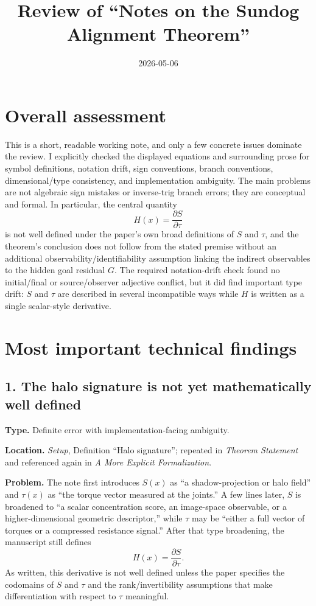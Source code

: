 \documentclass[11pt]{article}
\title{Review of ``Notes on the Sundog Alignment Theorem''}
\author{}
\date{2026-05-06}
\begin{document}
\maketitle

\section*{Overall assessment}

This is a short, readable working note, and only a few concrete issues dominate the review. I explicitly checked the displayed equations and surrounding prose for symbol definitions, notation drift, sign conventions, branch conventions, dimensional/type consistency, and implementation ambiguity. The main problems are not algebraic sign mistakes or inverse-trig branch errors; they are conceptual and formal. In particular, the central quantity
\[
H(x) = \frac{\partial S}{\partial \tau}
\]
is not well defined under the paper's own broad definitions of $S$ and $\tau$, and the theorem's conclusion does not follow from the stated premise without an additional observability/identifiability assumption linking the indirect observables to the hidden goal residual $G$. The required notation-drift check found no initial/final or source/observer adjective conflict, but it did find important type drift: $S$ and $\tau$ are described in several incompatible ways while $H$ is written as a single scalar-style derivative.

\section*{Most important technical findings}

\subsection*{1. The halo signature is not yet mathematically well defined}

\textbf{Type.} Definite error with implementation-facing ambiguity.

\textbf{Location.} \emph{Setup}, Definition ``Halo signature''; repeated in \emph{Theorem Statement} and referenced again in \emph{A More Explicit Formalization}.

\textbf{Problem.} The note first introduces $S(x)$ as ``a shadow-projection or halo field'' and $\tau(x)$ as ``the torque vector measured at the joints.'' A few lines later, $S$ is broadened to ``a scalar concentration score, an image-space observable, or a higher-dimensional geometric descriptor,'' while $\tau$ may be ``either a full vector of torques or a compressed resistance signal.'' After that type broadening, the manuscript still defines
\[
H(x) = \frac{\partial S}{\partial \tau}.
\]
As written, this derivative is not well defined unless the paper specifies the codomains of $S$ and $\tau$ and the rank/invertibility assumptions that make differentiation with respect to $\tau$ meaningful.
\end{document}
